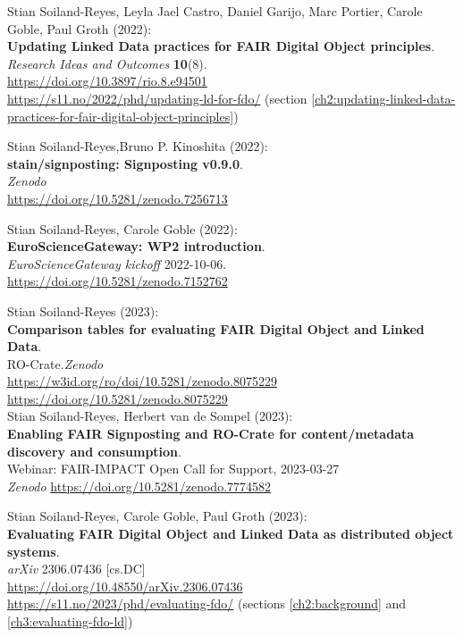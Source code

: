 \begin{thebibliography}{9}
Stian Soiland-Reyes, Leyla Jael Castro, Daniel Garijo, Marc Portier,
Carole Goble, Paul Groth (2022): \\
\textbf{Updating Linked Data practices for FAIR Digital Object principles}. \\
\emph{Research Ideas and Outcomes} \textbf{10}(8).\\
\url{https://doi.org/10.3897/rio.8.e94501}\\
\url{https://s11.no/2022/phd/updating-ld-for-fdo/} (section \vref{ch2:updating-linked-data-practices-for-fair-digital-object-principles})

Stian Soiland-Reyes,Bruno P. Kinoshita (2022):\\
\textbf{stain/signposting: Signposting v0.9.0}.\\
\emph{Zenodo}\\
\url{https://doi.org/10.5281/zenodo.7256713}

Stian Soiland-Reyes, Carole Goble (2022):\\
\textbf{EuroScienceGateway: WP2 introduction}.\\
\emph{EuroScienceGateway kickoff} 2022-10-06.\\
\url{https://doi.org/10.5281/zenodo.7152762}

Stian Soiland-Reyes (2023):\\
\textbf{Comparison tables for evaluating FAIR Digital Object and Linked Data}.\\
RO-Crate.\emph{Zenodo}\\
\url{https://w3id.org/ro/doi/10.5281/zenodo.8075229}\\
\url{https://doi.org/10.5281/zenodo.8075229}\\

Stian Soiland-Reyes, Herbert van de Sompel (2023):\\
\textbf{Enabling FAIR Signposting and RO-Crate for content/metadata discovery and consumption}.\\
Webinar: FAIR-IMPACT Open Call for Support, 2023-03-27 \\
\emph{Zenodo}
\url{https://doi.org/10.5281/zenodo.7774582}

Stian Soiland-Reyes, Carole Goble, Paul Groth (2023):\\
\textbf{Evaluating FAIR Digital Object and Linked Data as distributed object systems}.\\
\emph{arXiv} 2306.07436 [cs.DC] \\
\url{https://doi.org/10.48550/arXiv.2306.07436}\\
\url{https://s11.no/2023/phd/evaluating-fdo/}
(sections \vref{ch2:background} and \vref{ch3:evaluating-fdo-ld})


\end{thebibliography}
